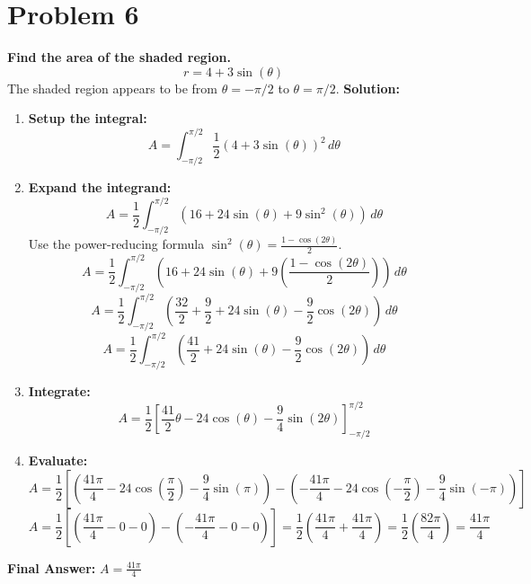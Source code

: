 \documentclass{article}
\begin{document}
\section*{Problem 6}
\textbf{Find the area of the shaded region.}
\[ r = 4 + 3\sin(\theta) \]
The shaded region appears to be from $\theta = -\pi/2$ to $\theta = \pi/2$.
\textbf{Solution:}
\begin{enumerate}
    \item \textbf{Setup the integral:}
    \[ A = \int_{-\pi/2}^{\pi/2} \frac{1}{2} (4 + 3\sin(\theta))^2 \,d\theta \]
    \item \textbf{Expand the integrand:}
    \[ A = \frac{1}{2} \int_{-\pi/2}^{\pi/2} (16 + 24\sin(\theta) + 9\sin^2(\theta)) \,d\theta \]
    Use the power-reducing formula $\sin^2(\theta) = \frac{1 - \cos(2\theta)}{2}$.
    \[ A = \frac{1}{2} \int_{-\pi/2}^{\pi/2} \left(16 + 24\sin(\theta) + 9\left(\frac{1 - \cos(2\theta)}{2}\right)\right) \,d\theta \]
    \[ A = \frac{1}{2} \int_{-\pi/2}^{\pi/2} \left(\frac{32}{2} + \frac{9}{2} + 24\sin(\theta) - \frac{9}{2}\cos(2\theta)\right) \,d\theta \]
    \[ A = \frac{1}{2} \int_{-\pi/2}^{\pi/2} \left(\frac{41}{2} + 24\sin(\theta) - \frac{9}{2}\cos(2\theta)\right) \,d\theta \]
    \item \textbf{Integrate:}
    \[ A = \frac{1}{2} \left[ \frac{41}{2}\theta - 24\cos(\theta) - \frac{9}{4}\sin(2\theta) \right]_{-\pi/2}^{\pi/2} \]
    \item \textbf{Evaluate:}
    \[ A = \frac{1}{2} \left[ \left(\frac{41\pi}{4} - 24\cos(\frac{\pi}{2}) - \frac{9}{4}\sin(\pi)\right) - \left(-\frac{41\pi}{4} - 24\cos(-\frac{\pi}{2}) - \frac{9}{4}\sin(-\pi)\right) \right] \]
    \[ A = \frac{1}{2} \left[ \left(\frac{41\pi}{4} - 0 - 0\right) - \left(-\frac{41\pi}{4} - 0 - 0\right) \right] = \frac{1}{2} \left( \frac{41\pi}{4} + \frac{41\pi}{4} \right) = \frac{1}{2}\left(\frac{82\pi}{4}\right) = \frac{41\pi}{4} \]
\end{enumerate}
\textbf{Final Answer:} $A = \frac{41\pi}{4}$
\end{document}
